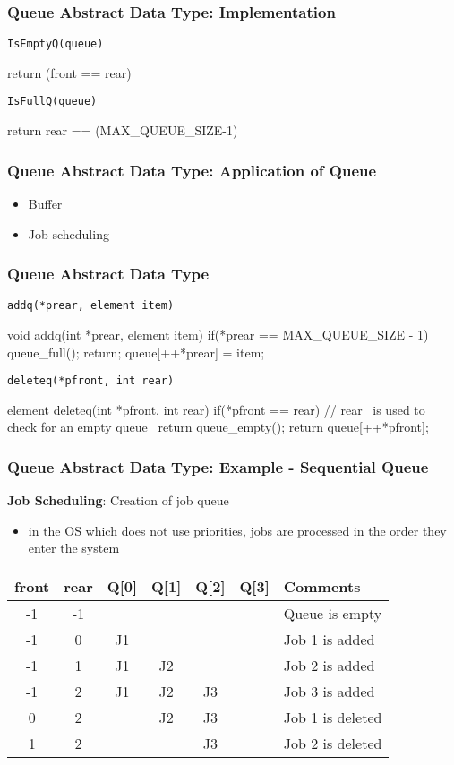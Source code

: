 \documentclass[newPxFont,sthlmFooter,nooffset]{beamer}
\begin{document}
\begin{frame}[t, fragile]
  \frametitle{Queue Abstract Data Type: Implementation}
\texttt{IsEmptyQ(queue)}
\begin{codedef}
return (front == rear)
\end{codedef}
\texttt{IsFullQ(queue)}
\begin{codedef}
return rear == (MAX_QUEUE_SIZE-1)
\end{codedef}

\end{frame}

\begin{frame}[t]
	\frametitle{Queue Abstract Data Type: Application of Queue}
	\begin{itemize}
		\item Buffer
		\item Job scheduling
	\end{itemize}
\end{frame}

\begin{frame}[t, fragile]
  \frametitle{Queue Abstract Data Type}
\texttt{addq(*prear, element item)}
\begin{ncodedef}
void addq(int *prear, element item){
    if(*prear == MAX_QUEUE_SIZE - 1){
        queue_full();
        return;
    }
    queue[++*prear] = item;
}
\end{ncodedef}

\texttt{deleteq(*pfront, int rear)}
\begin{ncodedef}
element deleteq(int *pfront, int rear){
    if(*pfront == rear){ // rear ~is used to check for an empty queue~
        return queue_empty();
    }
    return queue[++*pfront];
}
\end{ncodedef}
\end{frame}

\begin{frame}[t]
  \frametitle{Queue Abstract Data Type: Example - Sequential Queue}
\textbf{Job Scheduling}: Creation of job queue
\begin{itemize}
\item in the OS which does not use priorities, jobs are processed in the order they enter the system
\end{itemize}
\begin{tabular}{c | c | c c c c | l}
  front & rear & Q[0] & Q[1] & Q[2] & Q[3] & Comments \\ \hline \hline
    -1  &  -1  &      &      &      &      & Queue is empty \\
    -1  &   0  &  J1  &      &      &      & Job 1 is added \\
    -1  &   1  &  J1  &  J2  &      &      & Job 2 is added \\
    -1  &   2  &  J1  &  J2  &  J3  &      & Job 3 is added \\
     0  &   2  &      &  J2  &  J3  &      & Job 1 is deleted \\
     1  &   2  &      &      &  J3  &      & Job 2 is deleted \\
\end{tabular}
\end{frame}
\end{document}
